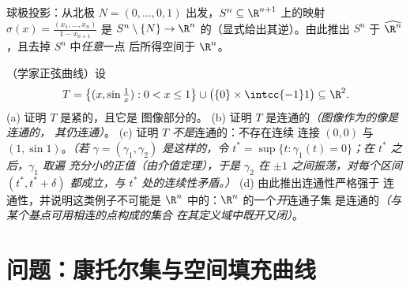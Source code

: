 \begin{exercise}[$\star\star\star$]\label{exo:b3:topology:11}
球极投影：从北极 $N = (0, \dots,
0, 1)$ 出发，$S^n \subseteq \R^{n+1}$ 上的映射 $\sigma(x) =
\frac{(x_1, \dots, x_n)}{1 - x_{n+1}}$ 是 $S^n
\setminus \{N\} \to \R^n$ 的（显式给出其逆）。由此推出
$S^n$ 于
$\widehat{\R^n}$，且去掉 $S^n$ 中\emph{任意}一点
后所得空间于 $\R^n$。
\end{exercise}

\begin{exercise}[$\star\star\star$]\label{exo:b3:topology:12}
（学家正弦曲线）设
\[
T = \bigl\{(x, \sin\tfrac1x) : 0 < x \leq 1\bigr\}
\cup \bigl(\{0\}\times\intcc{-1}1\bigr) \subseteq \R^2 .
\]
(a) 证明 $T$ 是紧的，且它是
图像部分的。
(b) 证明 $T$ 是连通的\emph{（图像作为的像是连通的，
其仍连通）}。
(c) 证明 $T$ \emph{不是}连通的：不存在连续
连接 $(0,0)$ 与 $(1, \sin1)$。\emph{（若 $\gamma =
(\gamma_1, \gamma_2)$ 是这样的，令 $t^* = \sup\{t :
\gamma_1(t) = 0\}$；在 $t^*$ 之后，$\gamma_1$ 取遍
充分小的正值（由介值定理），于是
$\gamma_2$ 在 $\pm1$ 之间振荡，对每个区间
$(t^*, t^* + \delta)$ 都成立，与 $t^*$ 处的连续性矛盾。）}
(d) 由此推出连通性严格强于
连通性，并说明这类例子不可能是
$\R^n$ 中的：$\R^n$ 的一个\emph{开}连通子集
是连通的\emph{（与某个基点可用相连的点构成的集合
在其定义域中既开又闭）}。
\end{exercise}

\section{问题：康托尔集与空间填充曲线}

